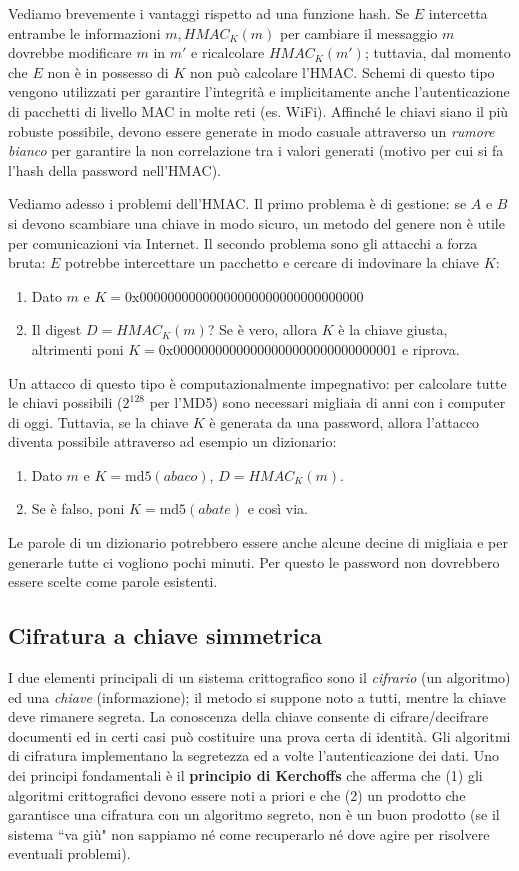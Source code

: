 Vediamo brevemente i vantaggi rispetto ad una funzione hash. Se $E$ intercetta entrambe le informazioni $m, HMAC_K(m)$ per cambiare il messaggio $m$ dovrebbe modificare $m$ in $m'$ e ricalcolare $HMAC_K(m')$; tuttavia, dal momento che $E$ non è in possesso di $K$ non può calcolare l'HMAC. Schemi di questo tipo vengono utilizzati per garantire l'integrità e implicitamente anche l'autenticazione di pacchetti di livello MAC in molte reti (es. WiFi). Affinché le chiavi siano il più robuste possibile, devono essere generate in modo casuale attraverso un \textit{rumore bianco} per garantire la non correlazione tra i valori generati (motivo per cui si fa l'hash della password nell'HMAC).

Vediamo adesso i problemi dell'HMAC. Il primo problema è di gestione: se $A$ e $B$ si devono scambiare una chiave in modo sicuro, un metodo del genere non è utile per comunicazioni via Internet. Il secondo problema sono gli attacchi a forza bruta: $E$ potrebbe intercettare un pacchetto e cercare di indovinare la chiave $K$:
\begin{enumerate}
	\item Dato $m$ e $K=0\text{x}00000000000000000000000000000000$
	\item Il digest $D=HMAC_K(m)$? Se è vero, allora $K$ è la chiave giusta, altrimenti poni $K=0\text{x}00000000000000000000000000000001$ e riprova.
\end{enumerate}
Un attacco di questo tipo è computazionalmente impegnativo: per calcolare tutte le chiavi possibili ($2^{128}$ per l'MD5) sono necessari migliaia di anni con i computer di oggi. Tuttavia, se la chiave $K$ è generata da una password, allora l'attacco diventa possibile attraverso ad esempio un dizionario:
\begin{enumerate}
	\item Dato $m$ e $K=\text{md5}(abaco)$, $D=HMAC_K(m)$.
	\item Se è falso, poni $K=\text{md5}(abate)$ e così via.
\end{enumerate}
Le parole di un dizionario potrebbero essere anche alcune decine di migliaia e per generarle tutte ci vogliono pochi minuti. Per questo le password non dovrebbero essere scelte come parole esistenti.

\subsection{Cifratura a chiave simmetrica}
I due elementi principali di un sistema crittografico sono il \textit{cifrario} (un algoritmo) ed una \textit{chiave} (informazione); il metodo si suppone noto a tutti, mentre la chiave deve rimanere segreta. La conoscenza della chiave consente di cifrare/decifrare documenti ed in certi casi può costituire una prova certa di identità. Gli algoritmi di cifratura implementano la segretezza ed a volte l'autenticazione dei dati. Uno dei principi fondamentali è il \textbf{principio di Kerchoffs} che afferma che (1) gli algoritmi crittografici devono essere noti a priori e che (2) un prodotto che garantisce una cifratura con un algoritmo segreto, non è un buon prodotto (se il sistema \textquotedblleft va giù" non sappiamo né come recuperarlo né dove agire per risolvere eventuali problemi).

